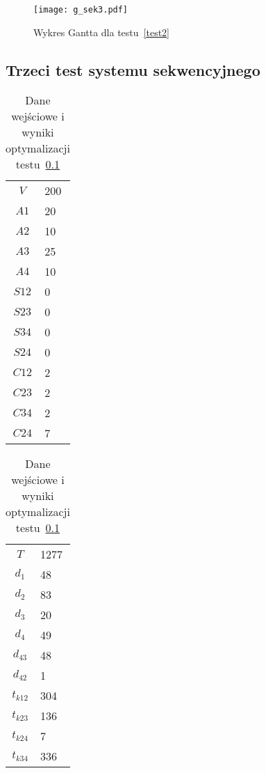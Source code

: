 \begin{figure}[H]
\centering
\texttt{[image: g\_sek3.pdf]}
\caption{Wykres Gantta dla testu~\ref{test2}}
\label{fig:res_2b}
\end{figure}

\subsection{Trzeci test systemu sekwencyjnego} \label{test3}

\begin{table}[H]
\begin{minipage}[b]{0.5\linewidth}
\centering
\begin{tabular}{c l}
$V$ & 200 \\
$A1$ & 20 \\
$A2$ & 10 \\
$A3$ & 25 \\
$A4$ & 10 \\
$S12$ & 0 \\
$S23$ & 0 \\
$S34$ & 0 \\
$S24$ & 0 \\
$C12$ & 2 \\
$C23$ & 2 \\
$C34$ & 2 \\
$C24$ & 7 \\
\end{tabular}
\end{minipage}
\hspace{0.5cm}
\begin{minipage}[b]{0.5\linewidth}
\centering
\begin{tabular}{c l}
$T$ & 1277 \\
$d_{1}$ & 48 \\
$d_{2}$ & 83 \\
$d_{3}$ & 20 \\
$d_{4}$ & 49 \\
$d_{43}$ & 48 \\
$d_{42}$ & 1 \\
$t_{k12}$ & 304 \\
$t_{k23}$ & 136 \\
$t_{k24}$ & 7 \\
$t_{k34}$ & 336 \\
\end{tabular}
\end{minipage}
\caption{Dane wejściowe i wyniki optymalizacji testu~\ref{test3}}
\label{tab:res_3a}
\end{table}

